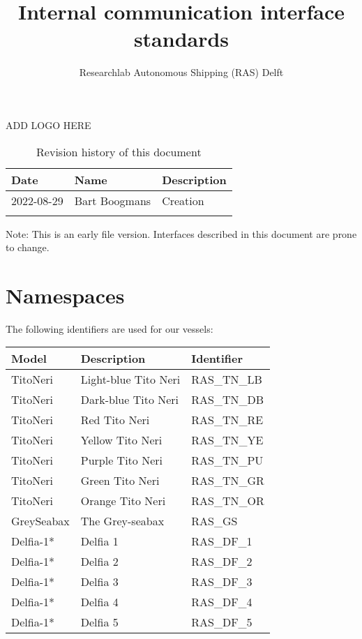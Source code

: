 \documentclass[]{article}
\title{Internal communication interface standards}
\author{Researchlab Autonomous Shipping (RAS) Delft}
\begin{document}
\maketitle
 ADD LOGO HERE
 
\begin{table}[H]
	\centering
	\begin{tabular}{lll}
		Date       & Name          & Description \\ \hline
		2022-08-29 & Bart Boogmans & Creation    \\
		&               &            
	\end{tabular}
	\caption{Revision history of this document}
\end{table}

Note: This is an early file version. Interfaces described in this document are prone to change. 


\section{Namespaces}
The following identifiers are used for our vessels:

\begin{table}[H]
	\centering
	\begin{tabular}{lll}
		Model    & Description          & Identifier  \\ \hline
		TitoNeri & Light-blue Tito Neri & RAS\_TN\_LB \\
		TitoNeri & Dark-blue Tito Neri        & RAS\_TN\_DB \\
		TitoNeri & Red Tito Neri        & RAS\_TN\_RE \\
		TitoNeri & Yellow Tito Neri        & RAS\_TN\_YE \\
		TitoNeri & Purple Tito Neri        & RAS\_TN\_PU \\

		TitoNeri & Green Tito Neri        & RAS\_TN\_GR \\
		TitoNeri & Orange Tito Neri        & RAS\_TN\_OR \\
		GreySeabax & The Grey-seabax        & RAS\_GS \\
		Delfia-1* & Delfia 1       & RAS\_DF\_1 \\
		Delfia-1* & Delfia 2       & RAS\_DF\_2 \\
		Delfia-1* & Delfia 3       & RAS\_DF\_3 \\
		Delfia-1* & Delfia 4       & RAS\_DF\_4 \\
		Delfia-1* & Delfia 5       & RAS\_DF\_5 
		
	\end{tabular}
\end{table}
\end{document}
